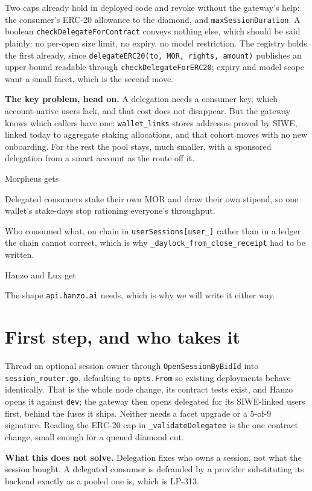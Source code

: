 \documentclass[10pt,a4paper]{article}
\begin{document}
Two caps already hold in deployed code and revoke without the gateway's help: the consumer's
ERC-20 allowance to the diamond, and \texttt{maxSessionDuration}. A boolean
\texttt{checkDelegateForContract} conveys nothing else, which should be said plainly: no per-open
size limit, no expiry, no model restriction. The registry holds the first already, since \texttt{delegateERC20(to,
MOR, rights, amount)} publishes an upper bound readable through \texttt{checkDelegateForERC20};
expiry and model scope want a small facet, which is the second move.

\textbf{The key problem, head on.} A delegation needs a consumer key, which account-native users
lack, and that cost does not disappear. But the gateway knows which callers
have one: \texttt{wallet\_links} stores addresses proved by SIWE, linked today to aggregate staking
allocations, and that cohort moves with no new onboarding. For the rest the pool stays, much
smaller, with a sponsored delegation from a smart account as the route off it.

\begin{stake}{Morpheus gets}
\item Delegated consumers stake their own MOR and draw their own stipend, so one wallet's
      stake-days stop rationing everyone's throughput.
\item Who consumed what, on chain in \texttt{userSessions[user\_]} rather than in a ledger the
      chain cannot correct, which is why \texttt{\_daylock\_from\_close\_receipt} had to be written.
\end{stake}

\begin{stake}{Hanzo and Lux get}
\item The shape \texttt{api.hanzo.ai} needs, which is why we will write it either way.
\end{stake}

\section*{First step, and who takes it}

Thread an optional session owner through \texttt{OpenSessionByBidId} into
\texttt{session\_router.go}, defaulting to \texttt{opts.From} so existing deployments behave
identically. That is the whole node change, its contract tests exist, and Hanzo opens it against
\texttt{dev}; the gateway then opens delegated for its SIWE-linked users first, behind the fuses it
ships. Neither needs a facet upgrade or a 5-of-9 signature. Reading the ERC-20 cap in
\texttt{\_validateDelegatee} is the one contract change, small enough for a queued diamond cut.

\noindent\textbf{What this does not solve.} Delegation fixes who owns a session, not what the
session bought. A delegated consumer is defrauded by a provider substituting its backend exactly as
a pooled one is, which is LP-313.

\end{document}
